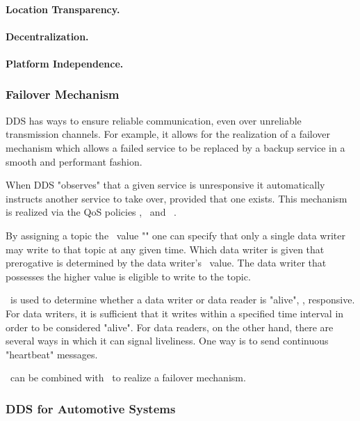\paragraph{Location Transparency.}

\paragraph{Decentralization.}

\paragraph{Platform Independence.}


\subsubsection{Failover Mechanism}

DDS has ways to ensure reliable communication, even over unreliable transmission channels. For example, it allows for the realization of a failover mechanism which allows a failed service to be replaced by a backup service in a smooth and performant fashion. 

When DDS "observes" that a given service is unresponsive it automatically instructs another service to take over, provided that one exists. This mechanism is realized via the QoS policies \ownership , \ostrength\ and \liveliness\ . 

By assigning a topic the \ownership\ value "" one can specify that only a single data writer may write to that topic at any given time. Which data writer is given that prerogative is determined by the data writer's \ostrength\ value. The data writer that possesses the higher value is eligible to write to the topic.

\liveliness\ is used to determine whether a data writer or data reader is "alive", \ie , responsive. For data writers, it is sufficient that it writes within a specified time interval in order to be considered "alive". For data readers, on the other hand, there are several ways in which it can signal liveliness. One way is to send continuous "heartbeat" messages.

\ownership\ can be combined with \liveliness\ to realize a failover mechanism.


\subsubsection{DDS for Automotive Systems}


